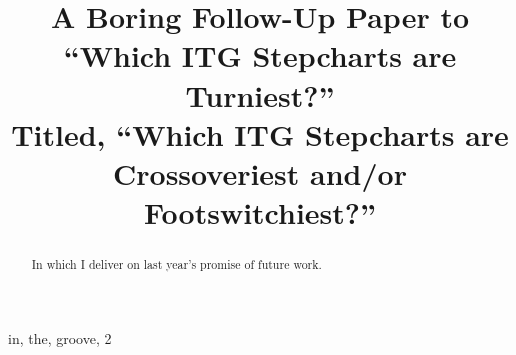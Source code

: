\documentclass[10pt]{sigplanconf}
\begin{document}
\copyrightdata{}


\title{
A Boring Follow-Up Paper to \\
``Which ITG Stepcharts are Turniest?'' \\
Titled, ``Which ITG Stepcharts are Crossoveriest and/or Footswitchiest?'' \\
}


\maketitle

\begin{abstract}

In which I deliver on last year's promise of future work.

\end{abstract}


\keywords
in, the, groove, 2
\end{document}
